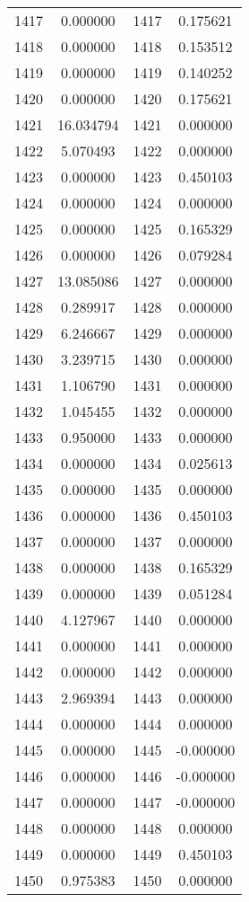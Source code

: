 \documentclass[12pt]{article}
\begin{document}
\begin{longtable}{@{}cccc@{}}
1417 & 0.000000 & 1417 & 0.175621 \\
1418 & 0.000000 & 1418 & 0.153512 \\
1419 & 0.000000 & 1419 & 0.140252 \\
1420 & 0.000000 & 1420 & 0.175621 \\
1421 & 16.034794 & 1421 & 0.000000 \\
1422 & 5.070493 & 1422 & 0.000000 \\
1423 & 0.000000 & 1423 & 0.450103 \\
1424 & 0.000000 & 1424 & 0.000000 \\
1425 & 0.000000 & 1425 & 0.165329 \\
1426 & 0.000000 & 1426 & 0.079284 \\
1427 & 13.085086 & 1427 & 0.000000 \\
1428 & 0.289917 & 1428 & 0.000000 \\
1429 & 6.246667 & 1429 & 0.000000 \\
1430 & 3.239715 & 1430 & 0.000000 \\
1431 & 1.106790 & 1431 & 0.000000 \\
1432 & 1.045455 & 1432 & 0.000000 \\
1433 & 0.950000 & 1433 & 0.000000 \\
1434 & 0.000000 & 1434 & 0.025613 \\
1435 & 0.000000 & 1435 & 0.000000 \\
1436 & 0.000000 & 1436 & 0.450103 \\
1437 & 0.000000 & 1437 & 0.000000 \\
1438 & 0.000000 & 1438 & 0.165329 \\
1439 & 0.000000 & 1439 & 0.051284 \\
1440 & 4.127967 & 1440 & 0.000000 \\
1441 & 0.000000 & 1441 & 0.000000 \\
1442 & 0.000000 & 1442 & 0.000000 \\
1443 & 2.969394 & 1443 & 0.000000 \\
1444 & 0.000000 & 1444 & 0.000000 \\
1445 & 0.000000 & 1445 & -0.000000 \\
1446 & 0.000000 & 1446 & -0.000000 \\
1447 & 0.000000 & 1447 & -0.000000 \\
1448 & 0.000000 & 1448 & 0.000000 \\
1449 & 0.000000 & 1449 & 0.450103 \\
1450 & 0.975383 & 1450 & 0.000000 \\

\end{longtable}
\end{document}
